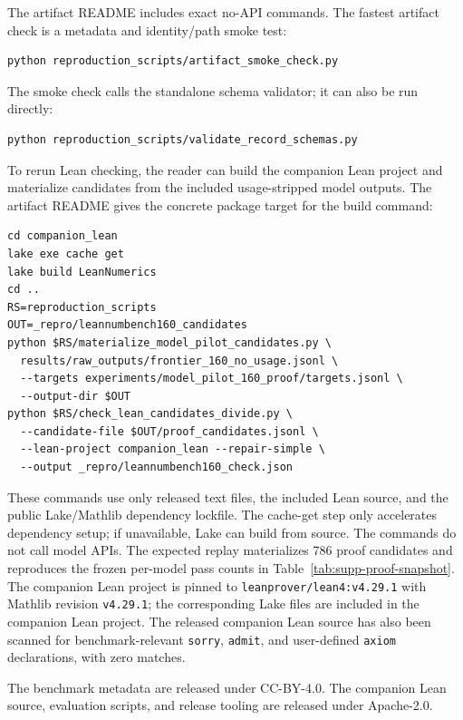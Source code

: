 The artifact README includes exact no-API commands. The fastest artifact check
is a metadata and identity/path smoke test:

\begin{verbatim}
python reproduction_scripts/artifact_smoke_check.py
\end{verbatim}

The smoke check calls the standalone schema validator; it can also be run
directly:

\begin{verbatim}
python reproduction_scripts/validate_record_schemas.py
\end{verbatim}

To rerun Lean checking, the reader can build the companion Lean project and
materialize candidates from the included usage-stripped model outputs. The
artifact README gives the concrete package target for the build command:

\begin{verbatim}
cd companion_lean
lake exe cache get
lake build LeanNumerics
cd ..
RS=reproduction_scripts
OUT=_repro/leannumbench160_candidates
python $RS/materialize_model_pilot_candidates.py \
  results/raw_outputs/frontier_160_no_usage.jsonl \
  --targets experiments/model_pilot_160_proof/targets.jsonl \
  --output-dir $OUT
python $RS/check_lean_candidates_divide.py \
  --candidate-file $OUT/proof_candidates.jsonl \
  --lean-project companion_lean --repair-simple \
  --output _repro/leannumbench160_check.json
\end{verbatim}

These commands use only released text files, the included Lean source, and the
public Lake/Mathlib dependency lockfile. The cache-get step only accelerates
dependency setup; if unavailable, Lake can build from source. The commands do
not call model APIs. The expected replay materializes 786 proof candidates and
reproduces the frozen per-model pass counts in
Table~\ref{tab:supp-proof-snapshot}. The companion Lean project is pinned to
\texttt{leanprover/lean4:v4.29.1} with Mathlib revision \texttt{v4.29.1};
the corresponding Lake files are included in the companion Lean project.
The released companion Lean source has also been scanned for
benchmark-relevant \texttt{sorry}, \texttt{admit}, and user-defined
\texttt{axiom} declarations, with zero matches.

The benchmark metadata are released under CC-BY-4.0. The companion Lean
source, evaluation scripts, and release tooling are released under
Apache-2.0.


